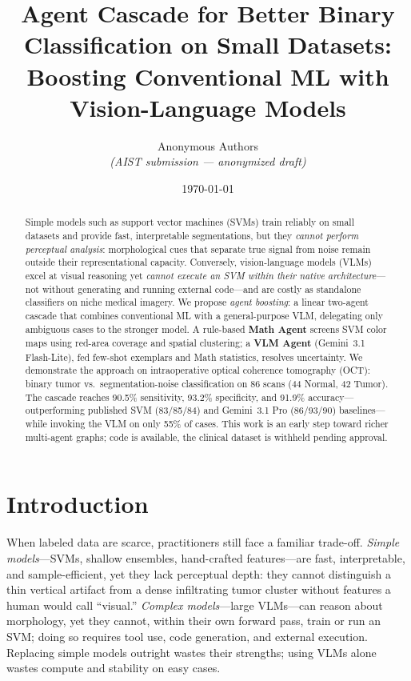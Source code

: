 \documentclass[11pt]{article}
\title{%
  Agent Cascade for Better Binary Classification on Small Datasets:\\
  Boosting Conventional ML with Vision-Language Models
}
\author{%
  Anonymous Authors\\
  \textit{(AIST submission --- anonymized draft)}
}
\date{\today}
\begin{document}
\maketitle

\begin{abstract}
Simple models such as support vector machines (SVMs) train reliably on small datasets and provide fast, interpretable segmentations, but they \emph{cannot perform perceptual analysis}: morphological cues that separate true signal from noise remain outside their representational capacity.
Conversely, vision-language models (VLMs) excel at visual reasoning yet \emph{cannot execute an SVM within their native architecture}---not without generating and running external code---and are costly as standalone classifiers on niche medical imagery.
We propose \emph{agent boosting}: a linear two-agent cascade that combines conventional ML with a general-purpose VLM, delegating only ambiguous cases to the stronger model.
A rule-based \textbf{Math Agent} screens SVM color maps using red-area coverage and spatial clustering; a \textbf{VLM Agent} (Gemini~3.1 Flash-Lite), fed few-shot exemplars and Math statistics, resolves uncertainty.
We demonstrate the approach on intraoperative optical coherence tomography (OCT): binary tumor vs.\ segmentation-noise classification on 86 scans (44 Normal, 42 Tumor).
The cascade reaches 90.5\% sensitivity, 93.2\% specificity, and 91.9\% accuracy---outperforming published SVM (83/85/84) and Gemini~3.1 Pro (86/93/90) baselines---while invoking the VLM on only 55\% of cases.
This work is an early step toward richer multi-agent graphs; code is available, the clinical dataset is withheld pending approval.
\end{abstract}

\section{Introduction}

When labeled data are scarce, practitioners still face a familiar trade-off.
\emph{Simple models}---SVMs, shallow ensembles, hand-crafted features---are fast, interpretable, and sample-efficient, yet they lack perceptual depth: they cannot distinguish a thin vertical artifact from a dense infiltrating tumor cluster without features a human would call ``visual.''
\emph{Complex models}---large VLMs---can reason about morphology, yet they cannot, within their own forward pass, train or run an SVM; doing so requires tool use, code generation, and external execution.
Replacing simple models outright wastes their strengths; using VLMs alone wastes compute and stability on easy cases.
\end{document}
